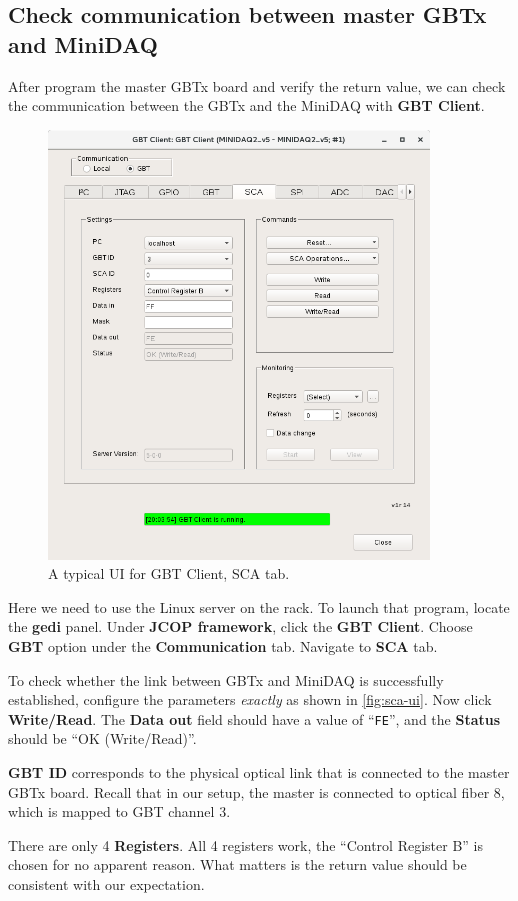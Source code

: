 \subsection{Check communication between master GBTx and MiniDAQ}
After program the master GBTx board and verify the return value, we can check
the communication between the GBTx and the MiniDAQ with \textbf{GBT Client}.

\begin{figure}[ht]
    \centering
    \includegraphics[width=0.9\textwidth]{res/gbt_client_master_gbt_sca_test.png}
    \caption{A typical UI for GBT Client, SCA tab.}
    \label{fig:sca-ui}
\end{figure}

Here we need to use the Linux server on the rack.
To launch that program, locate the \textbf{gedi} panel. Under
\textbf{JCOP framework},
click the \textbf{GBT Client}.
Choose \textbf{GBT} option under the \textbf{Communication} tab.
Navigate to \textbf{SCA} tab.

To check whether the link between GBTx and MiniDAQ is successfully established,
configure the parameters \emph{exactly} as shown in \autoref{fig:sca-ui}.
Now click \textbf{Write/Read}.
The \textbf{Data out} field should have a value of ``\texttt{FE}'', and the
\textbf{Status} should be ``OK (Write/Read)''.

\begin{leftbar}
    \textbf{GBT ID} corresponds to the physical optical link that is connected
    to the master GBTx board.
    Recall that in our setup, the master is connected to optical fiber 8, which
    is mapped to GBT channel 3.
\end{leftbar}

\begin{leftbar}
    There are only 4 \textbf{Registers}.
    All 4 registers work, the ``Control Register B'' is chosen for no apparent
    reason.
    What matters is the return value should be consistent with our expectation.
\end{leftbar}
